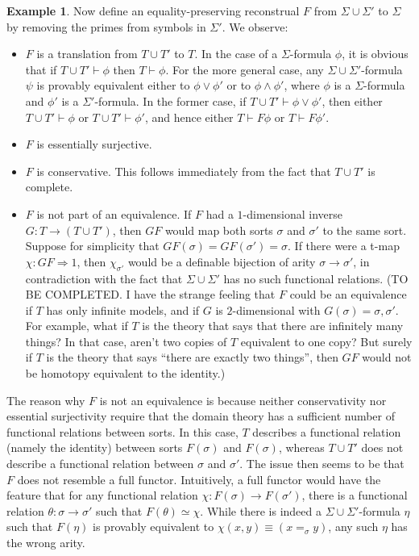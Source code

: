 \documentclass[12pt]{article}
\theoremstyle{definition}
\newtheorem{example}[prop]{Example}
\theoremstyle{remark}
\newcommand{\3}{\mathcal}
\begin{document}
\begin{example}
  Now define an equality-preserving reconstrual $F$ from
  $\Sigma\cup \Sigma '$ to $\Sigma$ by removing the primes from
  symbols in $\Sigma '$. We observe:
  \begin{itemize}
  \item $F$ is a translation from $T\cup T'$ to $T$. In the case of a
    $\Sigma$-formula $\phi$, it is obvious that if
    $T\cup T'\vdash\phi$ then $T\vdash\phi$. For the more general
    case, any $\Sigma\cup \Sigma '$-formula $\psi$ is provably
    equivalent either to $\phi \vee \phi '$ or to $\phi \wedge\phi '$,
    where $\phi$ is a $\Sigma$-formula and $\phi '$ is a
    $\Sigma '$-formula. In the former case, if
    $T\cup T'\vdash \phi \vee \phi '$, then either
    $T\cup T'\vdash \phi$ or $T\cup T'\vdash \phi '$, and hence either
    $T\vdash F\phi$ or $T\vdash F\phi '$.
  \item $F$ is essentially surjective.
  \item $F$ is conservative. This follows immediately from the fact
    that $T\cup T'$ is complete.
  \item $F$ is not part of an equivalence. If $F$ had a
    $1$-dimensional inverse $G:T\to (T\cup T')$, then $GF$ would map
    both sorts $\sigma$ and $\sigma '$ to the same sort. Suppose for
    simplicity that $GF(\sigma )=GF(\sigma ')=\sigma$. If there were a
    t-map $\chi :GF\Rightarrow 1$, then $\chi _{\sigma '}$ would be a
    definable bijection of arity $\sigma\to\sigma '$, in contradiction
    with the fact that $\Sigma \cup \Sigma '$ has no such functional
    relations. (TO BE COMPLETED. I have the strange feeling that $F$
    could be an equivalence if $T$ has only infinite models, and if
    $G$ is $2$-dimensional with $G(\sigma )=\sigma ,\sigma '$. For
    example, what if $T$ is the theory that says that there are
    infinitely many things? In that case, aren't two copies of $T$
    equivalent to one copy? But surely if $T$ is the theory that says
    ``there are exactly two things'', then $GF$ would not be homotopy
    equivalent to the identity.)
  \end{itemize}
  The reason why $F$ is not an equivalence is because neither
  conservativity nor essential surjectivity require that the domain
  theory has a sufficient number of functional relations between
  sorts. In this case, $T$ describes a functional relation (namely the
  identity) between sorts $F(\sigma )$ and $F(\sigma )$, whereas
  $T\cup T'$ does not describe a functional relation between $\sigma$
  and $\sigma '$.  The issue then seems to be that $F$ does not
  resemble a full functor. Intuitively, a full functor would have the
  feature that for any functional relation
  $\chi :F(\sigma )\to F(\sigma ')$, there is a functional relation
  $\theta :\sigma \to \sigma '$ such that $F(\theta )\simeq
  \chi$. While there is indeed a $\Sigma\cup \Sigma '$-formula $\eta$
  such that $F(\eta )$ is provably equivalent to
  $\chi (x,y)\equiv (x=_\sigma y)$, any such $\eta$ has the wrong
  arity.


\end{example}
\end{document}
